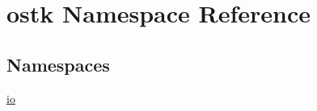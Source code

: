 \hypertarget{namespaceostk}{}\section{ostk Namespace Reference}
\label{namespaceostk}
\subsection*{Namespaces}
\begin{DoxyCompactItemize}
\item 
 \hyperlink{namespaceostk_1_1io}{io}
\end{DoxyCompactItemize}
